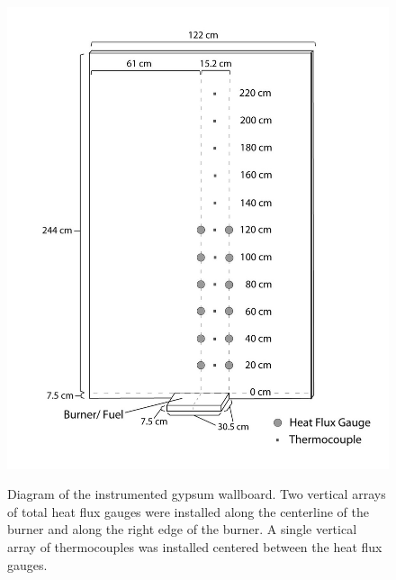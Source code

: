 \documentclass[twoside]{uocthesis}
\begin{document}
{\begin{figure}
	\centering
	\includegraphics[width=\textwidth]{../Figures/Instrumented_GB_Wall}\\
	\caption[Diagram of the instrumented gypsum wallboard]{Diagram of the instrumented gypsum wallboard. Two vertical arrays of total heat flux gauges were installed along the centerline of the burner and along the right edge of the burner. A single vertical array of thermocouples was installed centered between the heat flux gauges.}
	\label{Instrumented_GB_Wall}
\end{figure}

}
\end{document}
